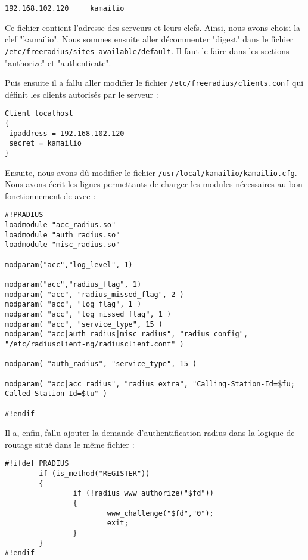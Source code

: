 \begin{verbatim}
192.168.102.120		kamailio
\end{verbatim}

Ce fichier contient l'adresse des serveurs {\rad} et leurs clefs. Ainsi, nous avons choisi la clef "kamailio".
Nous sommes ensuite aller décommenter "digest" dans le fichier \texttt{/etc/freeradius/sites-available/default}. Il faut le faire dans les sections "authorize" et "authenticate". 

Puis ensuite il a fallu aller modifier le fichier \texttt{/etc/freeradius/clients.conf} qui définit les clients autorisés par le serveur {\frad} :

\begin{verbatim}
Client localhost
{
 ipaddress = 192.168.102.120
 secret = kamailio
}
\end{verbatim}

Ensuite, nous avons dû modifier le fichier \texttt{/usr/local/kamailio/kamailio.cfg}. Nous avons écrit les lignes permettants de charger les modules nécessaires au bon fonctionnement de {\kam} avec {\frad} :

\begin{verbatim}
#!PRADIUS
loadmodule "acc_radius.so"
loadmodule "auth_radius.so"
loadmodule "misc_radius.so"

modparam("acc","log_level", 1)

modparam("acc","radius_flag", 1)
modparam( "acc", "radius_missed_flag", 2 )
modparam( "acc", "log_flag", 1 )
modparam( "acc", "log_missed_flag", 1 )
modparam( "acc", "service_type", 15 )
modparam( "acc|auth_radius|misc_radius", "radius_config", "/etc/radiusclient-ng/radiusclient.conf" )

modparam( "auth_radius", "service_type", 15 )

modparam( "acc|acc_radius", "radius_extra", "Calling-Station-Id=$fu; Called-Station-Id=$tu" )

#!endif
\end{verbatim}

Il a, enfin, fallu ajouter la demande d'authentification radius dans la logique de routage situé dans le même fichier :

\begin{verbatim}
#!ifdef PRADIUS
        if (is_method("REGISTER"))
        {
                if (!radius_www_authorize("$fd"))
                {
                        www_challenge("$fd","0");
                        exit;
                }
        }
#!endif
\end{verbatim}



